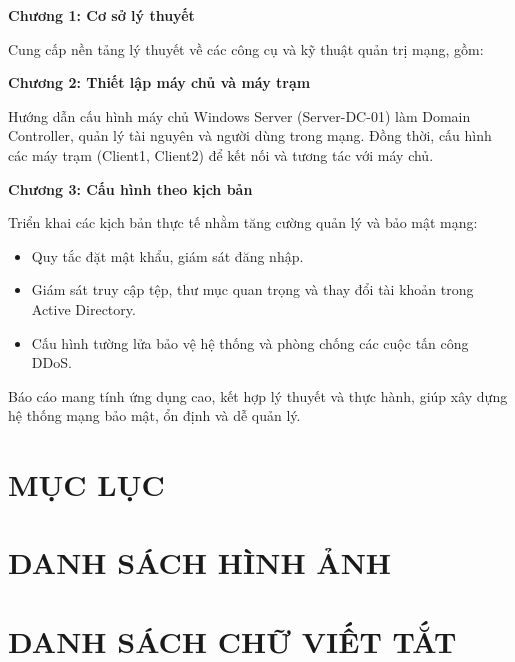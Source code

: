 \documentclass[13pt]{article}
\begin{document}
        \textbf{Chương 1: Cơ sở lý thuyết}
        
        Cung cấp nền tảng lý thuyết về các công cụ và kỹ thuật quản trị mạng, gồm:

    
        \textbf{Chương 2: Thiết lập máy chủ và máy trạm}
        
        Hướng dẫn cấu hình máy chủ Windows Server (Server-DC-01) làm Domain Controller, quản lý tài nguyên và người dùng trong mạng. Đồng thời, cấu hình các máy trạm (Client1, Client2) để kết nối và tương tác với máy chủ.
        
        \textbf{Chương 3: Cấu hình theo kịch bản}
        
        Triển khai các kịch bản thực tế nhằm tăng cường quản lý và bảo mật mạng:
        
        \begin{itemize}
            \item Quy tắc đặt mật khẩu, giám sát đăng nhập.
            \item Giám sát truy cập tệp, thư mục quan trọng và thay đổi tài khoản trong Active Directory.
            \item Cấu hình tường lửa bảo vệ hệ thống và phòng chống các cuộc tấn công DDoS.
        \end{itemize}
        Báo cáo mang tính ứng dụng cao, kết hợp lý thuyết và thực hành, giúp xây dựng hệ thống mạng bảo mật, ổn định và dễ quản lý.

 



        
	\newpage
        \section*{\centering \fontsize{16p}{20}\selectfont MỤC LỤC}
        \renewcommand{\contentsname}{} %
	\tableofcontents
	\newpage
        \section*{\centering \fontsize{16}{20}\selectfont DANH SÁCH HÌNH ẢNH}
        \renewcommand{\listfigurename}{} %
        \listoffigures
	\newpage
        \section*{\centering \fontsize{16}{20}\selectfont DANH SÁCH CHỮ VIẾT TẮT}
\end{document}
